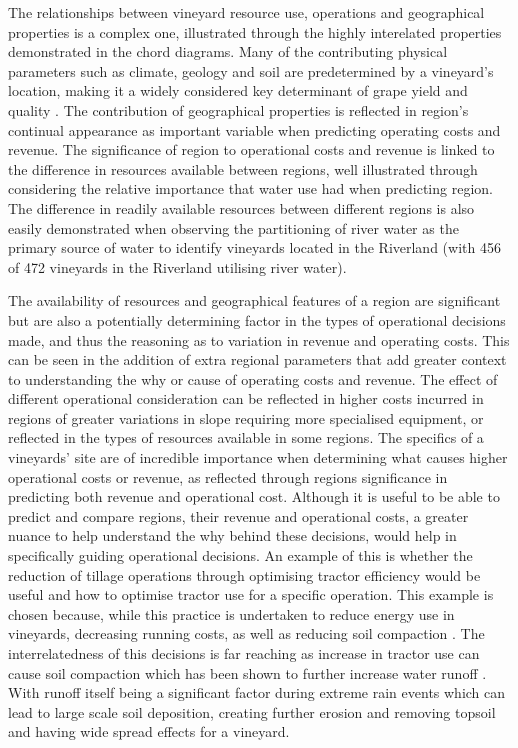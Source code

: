 \documentclass[review,12pt,authoryear]{elsarticle}
\begin{document}
\begin{linenumbers}
The relationships between vineyard resource use, operations and geographical properties is a complex one, illustrated through the highly interelated properties demonstrated in the chord diagrams. Many of the contributing physical parameters such as climate, geology and soil are predetermined by a vineyard's location, making it a widely considered key determinant of grape yield and quality \citep{abbalDecisionSupportSystem2016,agostaRegionalClimateVariability2012,fragaMultivariateClusteringViticultural2017}. The contribution of geographical properties is reflected in region's continual appearance as important variable when predicting operating costs and revenue. The significance of region to operational costs and revenue is linked to the difference in resources available between regions, well illustrated through considering the relative importance that water use had when predicting region. The difference in readily available resources between different regions is also easily demonstrated when observing the partitioning of river water as the primary source of water to identify vineyards located in the Riverland (with 456 of 472 vineyards in the Riverland utilising river water).
\par
The availability of resources and geographical features of a region are significant but are also a potentially determining factor in the types of operational decisions made, and thus the reasoning as to variation in revenue and operating costs. This can be seen in the addition of extra regional parameters that add greater context to understanding the why or cause of operating costs and revenue. The effect of different operational consideration can be reflected in higher costs incurred in regions of greater variations in slope requiring more specialised equipment, or reflected in the types of resources available in some regions. The specifics of a vineyards' site are of incredible importance when determining what causes higher operational costs or revenue, as reflected through regions significance in predicting both revenue and operational cost. Although it is useful to be able to predict and compare regions, their revenue and operational costs, a greater nuance to help understand the why behind these decisions, would help in specifically guiding operational decisions. An example of this is whether the reduction of tillage operations through optimising tractor efficiency would be useful and how to optimise tractor use for a specific operation. This example is chosen because, while this practice is undertaken to reduce energy use in vineyards, decreasing running costs, as well as reducing soil compaction \citep{capelloEffectsTractorPasses2019}. The interrelatedness of this decisions is far reaching as increase in tractor use can cause soil compaction which has been shown to further increase water runoff \citep{capelloPermanentCoverSoil2020}. With runoff itself being a significant factor during extreme rain events which can lead to large scale soil deposition, creating further erosion and removing topsoil and having wide spread effects for a vineyard. 

\end{linenumbers}
\end{document}
